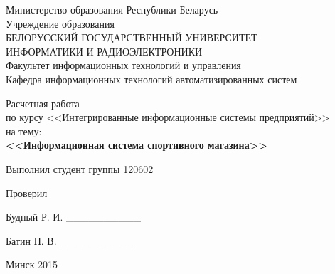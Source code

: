\begin{titlepage}
\thispagestyle{empty}
\setlength{\parindent}{0ex} %

\begin{center}
  Министерство образования Республики Беларусь \\
  \smallskip
  Учреждение образования \\
  БЕЛОРУССКИЙ ГОСУДАРСТВЕННЫЙ УНИВЕРСИТЕТ \\
  ИНФОРМАТИКИ И РАДИОЭЛЕКТРОНИКИ \\
  \smallskip
  Факультет информационных технологий и управления \\
  \smallskip
  Кафедра информационных технологий автоматизированных систем
\end{center}

\vspace{50mm}

\begin{center}
  Расчетная работа \\
  по курсу <<Интегрированные информационные системы предприятий>> \\
  на тему: \\
  \textbf{<<Информационная система спортивного магазина>>} \\
\end{center}

\vspace{30mm}

\begin{minipage}{.45\linewidth}
    Выполнил студент группы 120602

    \smallskip

    Проверил
\end{minipage}
\hfill
\begin{minipage}{.45\linewidth}
  \begin{flushright}
  Будный Р. И. \_\_\_\_\_\_\_\_\_\_

  \smallskip

  Батин Н. В. \_\_\_\_\_\_\_\_\_\_
  \end{flushright}
\end{minipage}

\vspace{60mm}
\begin{center}
  Минск 2015
\end{center}

\setlength{\parindent}{5ex} %
\end{titlepage}